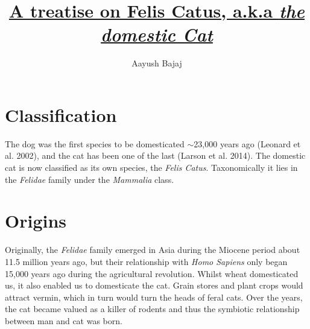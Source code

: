 \documentclass{article}
\title{\underline{A treatise on Felis Catus, a.k.a \emph{the domestic Cat}}}
\author{Aayush Bajaj}
\begin{document}
\maketitle{}
\dotfill

\section*{Classification}
The dog was the first species to be domesticated $\sim$23,000 years ago (Leonard et al. 2002), and the cat has been one of the last (Larson et al. 2014). The domestic cat is now classified as its own species, the \emph{Felis Catus}. Taxonomically it lies in the \emph{Felidae} family under the \emph{Mammalia} class.\\


\section*{Origins}
Originally, the \emph{Felidae} family emerged in Asia during the Miocene period about 11.5 million years ago, but their relationship with \emph{Homo Sapiens} only began 15,000 years ago during the agricultural revolution. Whilst wheat domesticated us, it also enabled us to domesticate the cat. Grain stores and plant crops would attract vermin, which in turn would turn the heads of feral cats. Over the years, the cat became valued as a killer of rodents and thus the symbiotic relationship between man and cat was born. 
\end{document}
